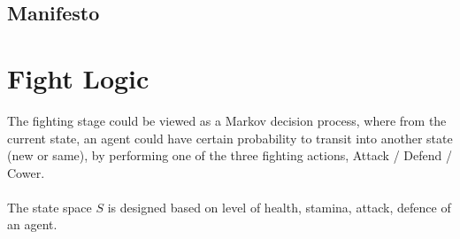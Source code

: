 \subsection{Manifesto}



\section{Fight Logic}
The fighting stage could be viewed as a Markov decision process, where from the current state, an agent could have certain probability to transit into another state (new or same), by performing one of the three fighting actions, Attack / Defend / Cower.
\\\\
The state space $S$ is designed based on level of health, stamina, attack, defence of an agent. 

